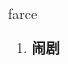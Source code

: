 
\begin{frame}
{\huge farce}
\begin{center}
\begin{enumerate}\Large
  \item \textbf{闹剧}
\end{enumerate}
\end{center}
\end{frame}
